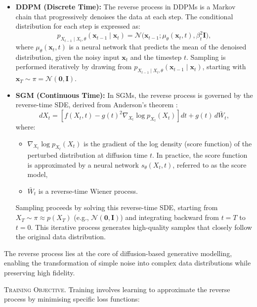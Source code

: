 \begin{itemize}
    \item \textbf{DDPM (Discrete Time):}
    The reverse process in DDPMs is a Markov chain that progressively denoises the data at each step. The conditional distribution for each step is expressed as:
    \[
    p_{X_{t-1} \mid X_t, \theta}(\mathbf{x}_{t-1} \mid \mathbf{x}_t) = \mathcal{N}\bigl(\mathbf{x}_{t-1}; \mu_\theta(\mathbf{x}_t, t), \beta_t^2 \mathbf{I}\bigr),
    \]
    where \( \mu_\theta(\mathbf{x}_t, t) \) is a neural network that predicts the mean of the denoised distribution, given the noisy input \( \mathbf{x}_t \) and the timestep \( t \). Sampling is performed iteratively by drawing from \( p_{X_{t-1} \mid X_t, \theta}(\mathbf{x}_{t-1} \mid \mathbf{x}_t) \), starting with \( \mathbf{x}_T \sim \pi = \mathcal{N}(\mathbf{0}, \mathbf{I}) \).
    \item \textbf{SGM (Continuous Time):}
    In SGMs, the reverse process is governed by the reverse-time SDE, derived from Anderson’s theorem \cite{anderson1982reverse_time_sde}:
    \[
    dX_t = \left[f(X_t, t) - g(t)^2 \nabla_{X_t} \log p_{X_t}(X_t)\right] dt + g(t) \, d\bar{W}_t,
    \]
    where:
    \begin{itemize}
        \item \( \nabla_{X_t} \log p_{X_t}(X_t) \) is the gradient of the log density (score function) of the perturbed distribution at diffusion time \( t \). In practice, the score function is approximated by a neural network \( s_\theta(X_t, t) \), referred to as the score model,
        \item \( \bar{W}_t \) is a reverse-time Wiener process.
    \end{itemize}

    Sampling proceeds by solving this reverse-time SDE, starting from \( X_T \sim \pi \approx p(X_T) \) (e.g., \( \mathcal{N}(\mathbf{0}, \mathbf{I}) \)) and integrating backward from \( t = T \) to \( t = 0 \). This iterative process generates high-quality samples that closely follow the original data distribution.

\end{itemize}

The reverse process lies at the core of diffusion-based generative modelling, enabling the transformation of simple noise into complex data distributions while preserving high fidelity.


\textsc{Training Objective.} Training involves learning to approximate the reverse process by minimising specific loss functions:

